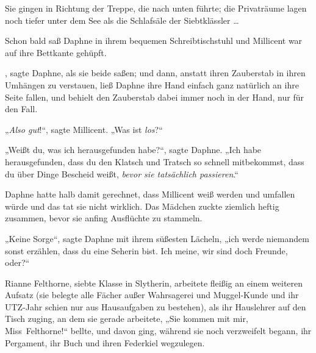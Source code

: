 Sie gingen in Richtung der Treppe, die nach unten führte; die Privaträume lagen noch tiefer unter dem See als die Schlafsäle der Siebtklässler …

Schon bald saß Daphne in ihrem bequemen Schreibtischstuhl und Millicent war auf ihre Bettkante gehüpft.

, sagte Daphne, als sie beide saßen; und dann, anstatt ihren Zauberstab in ihren Umhängen zu verstauen, ließ Daphne ihre Hand einfach ganz natürlich an ihre Seite fallen, und behielt den Zauberstab dabei immer noch in der Hand, nur für den Fall.

„\emph{Also gut}!“, sagte Millicent.
„Was ist \emph{los}?“

„Weißt du, was ich herausgefunden habe?“, sagte Daphne.
„Ich habe herausgefunden, dass du den Klatsch und Tratsch so schnell mitbekommst, dass du über Dinge Bescheid weißt, \emph{bevor sie tatsächlich passieren}.“

Daphne hatte halb damit gerechnet, dass Millicent weiß werden und umfallen würde und das tat sie nicht wirklich. Das Mädchen zuckte ziemlich heftig zusammen, bevor sie anfing Ausflüchte zu stammeln.

„Keine Sorge“, sagte Daphne mit ihrem süßesten Lächeln, „ich werde niemandem sonst erzählen, dass du eine Seherin bist. Ich meine, wir sind doch Freunde, oder?“

\later

Rianne Felthorne, siebte Klasse in Slytherin, arbeitete fleißig an einem weiteren Aufsatz (sie belegte alle Fächer außer Wahrsagerei und Muggel-Kunde und ihr UTZ-Jahr schien nur aus Hausaufgaben zu bestehen), als ihr Hauslehrer auf den Tisch zuging, an dem sie gerade arbeitete,
„Sie kommen mit mir, Miss~Felthorne!“ bellte, und davon ging, während sie noch verzweifelt begann, ihr Pergament, ihr Buch und ihren Federkiel wegzulegen.

